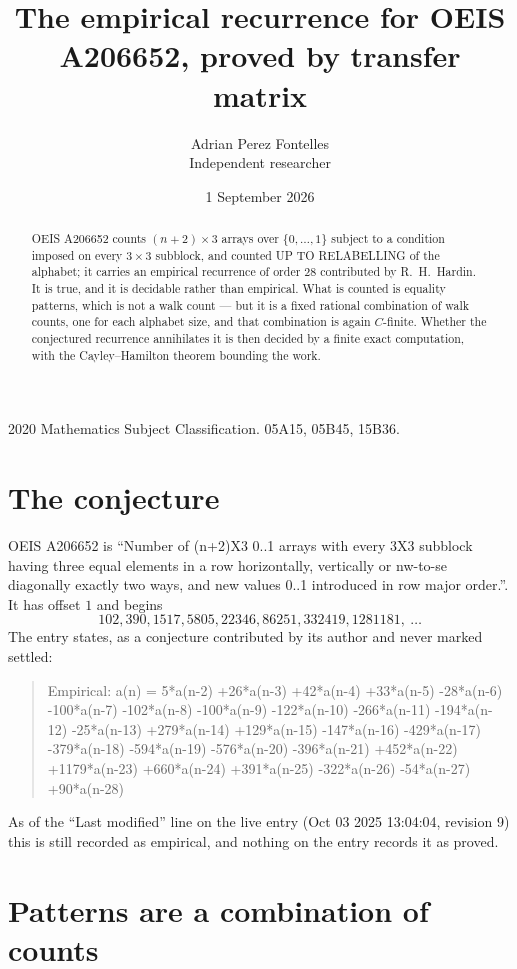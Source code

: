 \documentclass[11pt,a4paper]{article}
\title{The empirical recurrence for OEIS A206652, proved by transfer matrix}
\author{Adrian Perez Fontelles\\ \small Independent researcher}
\date{1 September 2026}
\theoremstyle{plain}
\theoremstyle{definition}
\begin{document}
\maketitle

\begin{abstract}
OEIS A206652 counts $(n+2)\times3$ arrays over $\{0,\dots,1\}$ subject to a condition imposed on
every $3\times3$ subblock, and counted UP TO RELABELLING of the
alphabet; it carries an empirical recurrence of order $28$ contributed by
R.~H.~Hardin. It is true, and it is decidable rather than empirical. What is counted is
equality patterns, which is not a walk count --- but it is a fixed rational combination of
walk counts, one for each alphabet size, and that combination is again $C$-finite. Whether the
conjectured recurrence annihilates it is then decided by a finite exact computation, with the
Cayley--Hamilton theorem bounding the work.
\end{abstract}

\noindent\small 2020 Mathematics Subject Classification. 05A15, 05B45, 15B36.\normalsize

\section{The conjecture}

OEIS A206652 is ``Number of (n+2)X3 0..1 arrays with every 3X3 subblock having three equal elements in a row horizontally, vertically or nw-to-se diagonally exactly two ways, and new values 0..1 introduced in row major order.''. It has offset $1$ and begins
\[
102, 390, 1517, 5805, 22346, 86251, 332419, 1281181,\ \dots
\]
The entry states, as a conjecture contributed by its author and never marked settled:
\begin{quote}
Empirical: a(n) = 5*a(n-2) +26*a(n-3) +42*a(n-4) +33*a(n-5) -28*a(n-6) -100*a(n-7) -102*a(n-8) -100*a(n-9) -122*a(n-10) -266*a(n-11) -194*a(n-12) -25*a(n-13) +279*a(n-14) +129*a(n-15) -147*a(n-16) -429*a(n-17) -379*a(n-18) -594*a(n-19) -576*a(n-20) -396*a(n-21) +452*a(n-22) +1179*a(n-23) +660*a(n-24) +391*a(n-25) -322*a(n-26) -54*a(n-27) +90*a(n-28)
\end{quote}
As of the ``Last modified'' line on the live entry (Oct 03 2025 13:04:04, revision 9) this is still
recorded as empirical, and nothing on the entry records it as proved.

\section{Patterns are a combination of counts}
\end{document}
